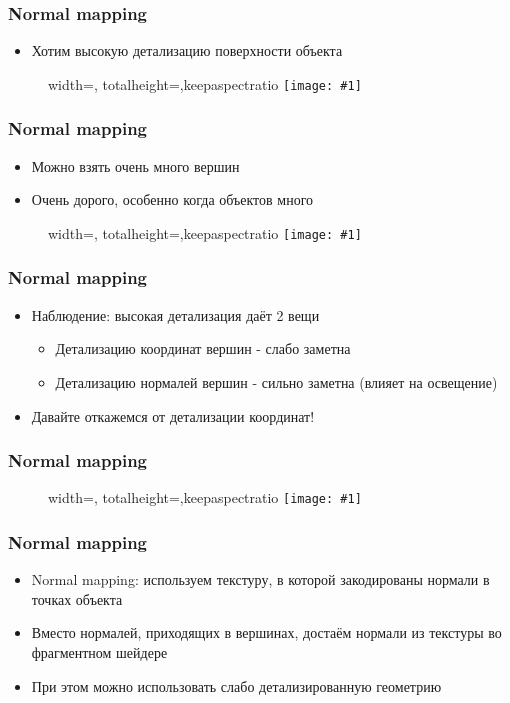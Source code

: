 \documentclass{beamer}
\newcommand{\slideimage}[1]{
  \begin{figure}
    \begin{adjustbox}{width=\textwidth, totalheight=\textheight-2\baselineskip-2\baselineskip,keepaspectratio}
      \texttt{[image: \#1]}
    \end{adjustbox}
  \end{figure}
}
\begin{document}
\begin{frame}[fragile]
\frametitle{Normal mapping}
\begin{itemize}
\item Хотим высокую детализацию поверхности объекта
\end{itemize}
\slideimage{orange.png}
\end{frame}

\begin{frame}[fragile]
\frametitle{Normal mapping}
\begin{itemize}
\item Можно взять очень много вершин
\pause
\item Очень дорого, особенно когда объектов много
\end{itemize}
\slideimage{orange-mesh.png}
\end{frame}

\begin{frame}[fragile]
\frametitle{Normal mapping}
\begin{itemize}
\item Наблюдение: высокая детализация даёт 2 вещи
\begin{itemize}
\item Детализацию координат вершин - слабо заметна
\item Детализацию нормалей вершин - сильно заметна (влияет на освещение)
\end{itemize}
\pause
\item Давайте откажемся от детализации координат!
\end{itemize}
\end{frame}

\begin{frame}[fragile]
\frametitle{Normal mapping}
\slideimage{orange-normal-map.png}
\end{frame}

\begin{frame}[fragile]
\frametitle{Normal mapping}
\begin{itemize}
\item Normal mapping: используем текстуру, в которой закодированы нормали в точках объекта
\pause
\item Вместо нормалей, приходящих в вершинах, достаём нормали из текстуры во фрагментном шейдере
\pause
\item При этом можно использовать слабо детализированную геометрию
\end{itemize}
\end{frame}
\end{document}
